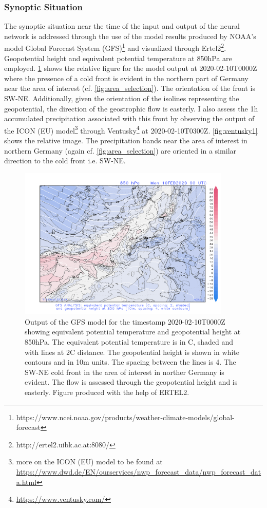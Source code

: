 \subsubsection{Synoptic Situation}
The synoptic situation near the time of the input and output of the neural network is addressed through the use of the model results produced by NOAA's model Global Forecast System (GFS)\footnote{https://www.ncei.noaa.gov/products/weather-climate-models/global-forecast} and visualized through Ertel2\footnote{http://ertel2.uibk.ac.at:8080/}. Geopotential height and equivalent potential temperature at 850hPa are employed. \cref{fig:ertel1} shows the relative figure for the model output at 2020-02-10T0000Z where the presence of a cold front is evident in the northern part of Germany near the area of interest (cf. \cref{fig:area_selection}). The orientation of the front is SW-NE. Additionally, given the orientation of the isolines representing the geopotential, the direction of the geostrophic flow is easterly. I also assess the 1h accumulated precipitation associated with this front by observing the output of the ICON (EU) model\footnote{more on the ICON (EU) model to be found at \newline \hyperlink{https://www.dwd.de/EN/ourservices/nwp\_forecast\_data/nwp\_forecast\_data.html}{https://www.dwd.de/EN/ourservices/nwp\_forecast\_data/nwp\_forecast\_data.html}} through Ventusky\footnote{\hyperlink{https://www.ventusky.com/}{https://www.ventusky.com/}} at 2020-02-10T0300Z. \cref{fig:ventusky1} shows the relative image. The precipitation bands near the area of interest in northern Germany (again cf. \cref{fig:area_selection}) are oriented in a similar direction to the cold front i.e. SW-NE.
\begin{figure}[!h]
    \centering
    \includegraphics[width=0.9\textwidth]{2002100000_gfs.png}
    \caption{Output of the GFS model for the timestamp 2020-02-10T0000Z showing equivalent potential temperature and geopotential height at 850hPa. The equivalent potential temperature is in C, shaded and with lines at 2\textdegree C distance. The geopotential height is shown in white contours and in 10m units. The spacing between the lines is 4. The SW-NE cold front in the area of interest in norther Germany is evident. The flow is assessed through the geopotential height and is easterly. Figure produced with the help of ERTEL2.}
    \label{fig:ertel1}
\end{figure}
